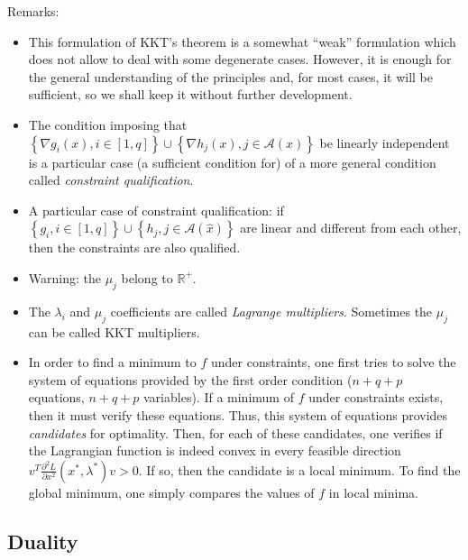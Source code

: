 \documentclass{article}
\begin{document}
\noindent Remarks:
\begin{itemize}
\item This formulation of KKT's theorem is a somewhat ``weak'' formulation which does not allow to deal with some degenerate cases. However, it is enough for the general understanding of the principles and, for most cases, it will be sufficient, so we shall keep it without further development.
\item The condition imposing that $\left\{ \nabla g_i(x), i\in [1,q] \right\} \cup \left\{ \nabla h_j(x), j\in \mathcal{A}(x) \right\}$ be linearly independent is a particular case (a sufficient condition for) of a more general condition called \emph{constraint qualification}.
\item A particular case of constraint qualification: if $\left\{g_i, i\in [1,q]\right\} \cup \left\{ h_j, j\in\mathcal{A}(\hat{x}) \right\}$ are linear and different from each other, then the constraints are also qualified.
\item Warning: the $\mu_j$ belong to $\mathbb{R}^+$.
\item The $\lambda_i$ and $\mu_j$ coefficients are called \emph{Lagrange multipliers}. Sometimes the $\mu_j$ can be called KKT multipliers.
\item In order to find a minimum to $f$ under constraints, one first tries to solve the system of equations provided by the first order condition ($n+q+p$ equations, $n+q+p$ variables). If a minimum of $f$ under constraints exists, then it must verify these equations. Thus, this system of equations provides \emph{candidates} for optimality. Then, for each of these candidates, one verifies if the Lagrangian function is indeed convex in every feasible direction $v^T \frac{\partial^2 L}{\partial x^2}(x^*,\lambda^*) v > 0$. If so, then the candidate is a local minimum. To find the global minimum, one simply compares the values of $f$ in local minima.
\end{itemize}

\subsection{Duality}
\end{document}
